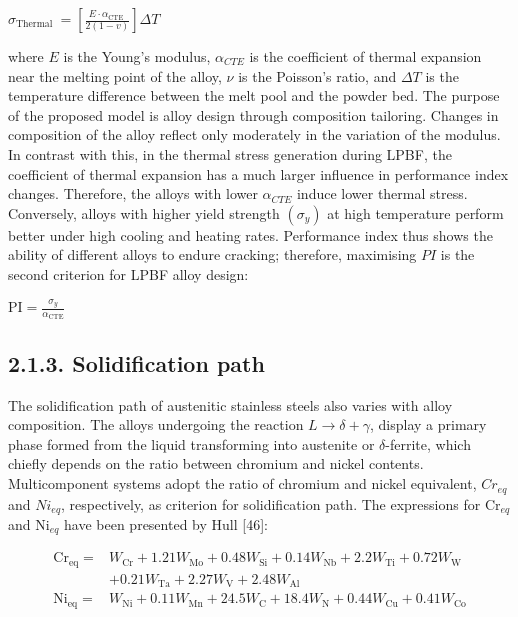 \documentclass[10pt]{article}
\begin{document}
$\sigma_{\text {Thermal }}=\left[\frac{E \cdot \alpha_{\text {CTE }}}{2(1-v)}\right] \Delta T$

where $E$ is the Young's modulus, $\alpha_{C T E}$ is the coefficient of thermal expansion near the melting point of the alloy, $\nu$ is the Poisson's ratio, and $\Delta T$ is the temperature difference between the melt pool and the powder bed. The purpose of the proposed model is alloy design through composition tailoring. Changes in composition of the alloy reflect only moderately in the variation of the modulus. In contrast with this, in the thermal stress generation during LPBF, the coefficient of thermal expansion has a much larger influence in performance index changes. Therefore, the alloys with lower $\alpha_{C T E}$ induce lower thermal stress. Conversely, alloys with higher yield strength $\left(\sigma_{y}\right)$ at high temperature perform better under high cooling and heating rates. Performance index thus shows the ability of different alloys to endure cracking; therefore, maximising $P I$ is the second criterion for LPBF alloy design:

$\mathrm{PI}=\frac{\sigma_{y}}{\alpha_{\mathrm{CTE}}}$

\subsection*{2.1.3. Solidification path}
The solidification path of austenitic stainless steels also varies with alloy composition. The alloys undergoing the reaction $L \rightarrow \delta+\gamma$, display a primary phase formed from the liquid transforming into austenite or $\delta$-ferrite, which chiefly depends on the ratio between chromium and nickel contents. Multicomponent systems adopt the ratio of chromium and nickel equivalent, $C r_{e q}$ and $N i_{e q}$, respectively, as criterion for solidification path. The expressions for $\mathrm{Cr}_{e q}$ and $\mathrm{Ni}_{e q}$ have been presented by Hull [46]:


\begin{align*}
\mathrm{Cr}_{\mathrm{eq}}= & W_{\mathrm{Cr}}+1.21 W_{\mathrm{Mo}}+0.48 W_{\mathrm{Si}}+0.14 W_{\mathrm{Nb}}+2.2 W_{\mathrm{Ti}}+0.72 W_{\mathrm{W}} \\
& +0.21 W_{\mathrm{Ta}}+2.27 W_{\mathrm{V}}+2.48 W_{\mathrm{Al}}  \tag{4}\\
\mathrm{Ni}_{\mathrm{eq}}= & W_{\mathrm{Ni}}+0.11 W_{\mathrm{Mn}}+24.5 W_{\mathrm{C}}+18.4 W_{\mathrm{N}}+0.44 W_{\mathrm{Cu}}+0.41 W_{\mathrm{Co}} \tag{5}
\end{align*}
\end{document}
